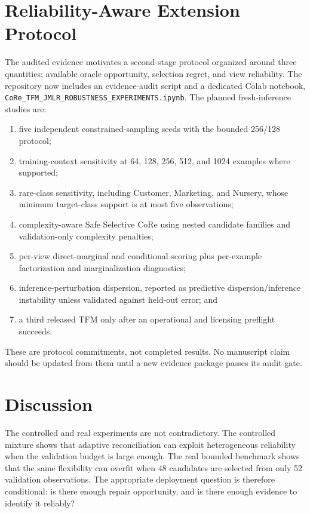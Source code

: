 \documentclass[twoside,11pt]{article}
\begin{document}
\section{Reliability-Aware Extension Protocol}
The audited evidence motivates a second-stage protocol organized around three quantities: available oracle opportunity, selection regret, and view reliability. The repository now includes an evidence-audit script and a dedicated Colab notebook, \texttt{CoRe\_TFM\_JMLR\_ROBUSTNESS\_EXPERIMENTS.ipynb}. The planned fresh-inference studies are:
\begin{enumerate}
\item five independent constrained-sampling seeds with the bounded 256/128 protocol;
\item training-context sensitivity at 64, 128, 256, 512, and 1024 examples where supported;
\item rare-class sensitivity, including Customer, Marketing, and Nursery, whose minimum target-class support is at most five observations;
\item complexity-aware Safe Selective CoRe using nested candidate families and validation-only complexity penalties;
\item per-view direct-marginal and conditional scoring plus per-example factorization and marginalization diagnostics;
\item inference-perturbation dispersion, reported as predictive dispersion/inference instability unless validated against held-out error; and
\item a third released TFM only after an operational and licensing preflight succeeds.
\end{enumerate}
These are protocol commitments, not completed results. No manuscript claim should be updated from them until a new evidence package passes its audit gate.

\section{Discussion}
The controlled and real experiments are not contradictory. The controlled mixture shows that adaptive reconciliation can exploit heterogeneous reliability when the validation budget is large enough. The real bounded benchmark shows that the same flexibility can overfit when 48 candidates are selected from only 52 validation observations. The appropriate deployment question is therefore conditional: is there enough repair opportunity, and is there enough evidence to identify it reliably?
\end{document}
